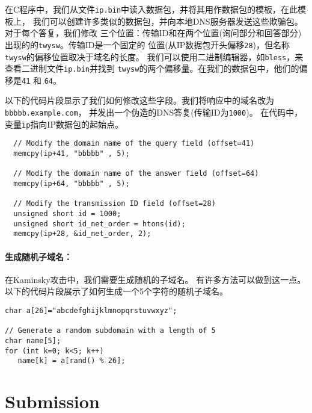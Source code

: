 在C程序中，我们从文件\texttt{ip.bin}中读入数据包，并将其用作数据包的模板，在此模板上，
我们可以创建许多类似的数据包，并向本地DNS服务器发送这些欺骗包。对于每个答复，我们修改
三个位置：传输ID和在两个位置(询问部分和回答部分)出现的的\texttt{twysw}。传输ID是一个固定的
位置(从IP数据包开头偏移\texttt{28})，但名称\texttt{twysw}的偏移位置取决于域名的长度。
我们可以使用二进制编辑器，如\texttt{bless}，来查看二进制文件\texttt{ip.bin}并找到
\texttt{twysw}的两个偏移量。在我们的数据包中，他们的偏移是\texttt{41} 和 \texttt{64}。


以下的代码片段显示了我们如何修改这些字段。我们将响应中的域名改为\texttt{bbbbb.example.com}，
并发出一个伪造的DNS答复(传输ID为\texttt{1000})。
在代码中，变量\texttt{ip}指向IP数据包的起始点。
 

\begin{lstlisting}
  // Modify the domain name of the query field (offset=41)
  memcpy(ip+41, "bbbbb" , 5);

  // Modify the domain name of the answer field (offset=64)
  memcpy(ip+64, "bbbbb" , 5);

  // Modify the transmission ID field (offset=28)
  unsigned short id = 1000;
  unsigned short id_net_order = htons(id);
  memcpy(ip+28, &id_net_order, 2);
\end{lstlisting}



\paragraph{生成随机子域名：} 在Kaminsky攻击中，我们需要生成随机的子域名。
有许多方法可以做到这一点。以下的代码片段展示了如何生成一个5个字符的随机子域名。


\begin{lstlisting}
char a[26]="abcdefghijklmnopqrstuvwxyz";

// Generate a random subdomain with a length of 5
char name[5];
for (int k=0; k<5; k++)  
   name[k] = a[rand() % 26];
\end{lstlisting}
 



\section{Submission}

\seedsubmission


\thispagestyle{empty}

\def\baselinestretch{1}









